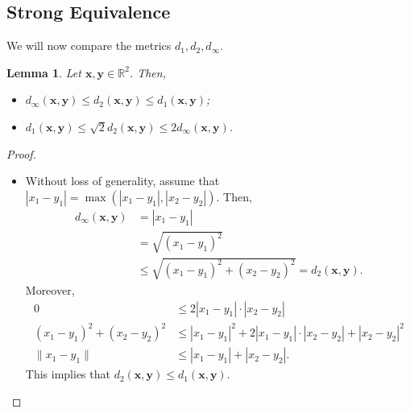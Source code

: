 \documentclass[a4paper, openany]{memoir}
\theoremstyle{definition}
\theoremstyle{plain}
\newtheorem{lemma}[definition]{Lemma}
\begin{document}
\subsection{Strong Equivalence}
We will now compare the metrics $d_1, d_2, d_\infty$.
\begin{lemma}
Let $\bm{x}, \bm{y} \in \mathbb{R}^2$. Then,
\begin{itemize}
    \item $d_\infty(\bm{x}, \bm{y}) \leqslant d_2(\bm{x}, \bm{y}) \leqslant d_1(\bm{x}, \bm{y})$;
    \item $d_1(\bm{x}, \bm{y}) \leqslant \sqrt{2} d_2(\bm{x}, \bm{y}) \leqslant 2 d_\infty(\bm{x}, \bm{y})$.
\end{itemize}
\end{lemma}
\begin{proof}
\hspace*{0pt}
\begin{itemize}
    \item Without loss of generality, assume that $|x_1 - y_1| = \max(|x_1 - y_1|, |x_2 - y_2|)$. Then,
    \begin{align*}
        d_\infty(\bm{x}, \bm{y}) &= |x_1 - y_1| \\
        &= \sqrt{(x_1 - y_1)^2} \\
        &\leqslant \sqrt{(x_1 - y_1)^2 + (x_2 - y_2)^2} = d_2(\bm{x}, \bm{y}).
    \end{align*}
    Moreover,
    \begin{align*}
        0 &\leqslant 2 |x_1 - y_1| \cdot |x_2 - y_2| \\
        (x_1 - y_1)^2 + (x_2 - y_2)^2 &\leqslant |x_1 - y_1|^2 + 2|x_1 - y_1| \cdot |x_2 - y_2| + |x_2 - y_2|^2 \\
        \lVert x_1 - y_1 \rVert &\leqslant |x_1 - y_1| + |x_2 - y_2|.
    \end{align*}
    This implies that $d_2(\bm{x}, \bm{y}) \leqslant d_1(\bm{x}, \bm{y})$.
    

\end{itemize}
\end{proof}
\end{document}
